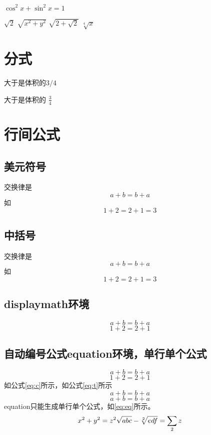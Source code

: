 \documentclass{ctexart}
\begin{document}
    $\cos^2x + \sin^2x = 1 $

    $\sqrt{2}$
    $\sqrt{x^2 + y^2}$
    $\sqrt{2+ \sqrt{2}}$
    $\sqrt[4]{x}$

    \section{分式}
    大于是体积的$3/4$

    大于是体积的 $\frac{3}{4}$

    \section{行间公式}
    \subsection{美元符号}
    交换律是 $$a+b=b+a$$ 如$$1+2=2+1=3$$
    \subsection{中括号}
     交换律是 \[a+b=b+a\] 如\[1+2=2+1=3\]
    \subsection{displaymath环境}
    \begin{displaymath} a+b=b+a \end{displaymath}
    \begin{displaymath} 1+2=2+1 \end{displaymath}
    \subsection{自动编号公式equation环境，单行单个公式}
        \begin{equation}
            a+b=b+a
        \end{equation}
        \begin{equation}
            1+2=2+1
        \end{equation}
        如公式\ref{eq:c}所示，如公式\ref{eq:t}所示
        \begin{equation}
            a+b=b+a
            \label{eq:c}
        \end{equation}
        \begin{equation}
            a+b=b+a
            \label{eq:t}
        \end{equation}
        equation只能生成单行单个公式，如\ref{eq:eq}所示。
        \begin{equation}
            \label{eq:eq}
            x^2+y^2=z^2 \\
            \sqrt{abc}-\sqrt[2]{edf} =\sum_2 z
        \end{equation}
\end{document}
